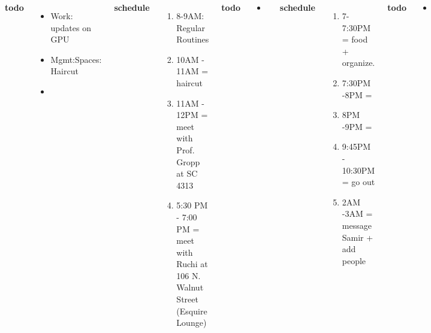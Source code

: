 \begin{frame}
{\begin{columns}
          \textbf{\small todo}\\ 
          \begin{itemize}
            \tiny \item \tiny Work: updates on GPU \dl{} \te{} \prio{}

            \tiny \item \tiny Mgmt:Spaces: Haircut  

            
          \item \tiny {} 
          \end{itemize}
          \textbf{\small schedule}\\
          \begin{enumerate}
            \tiny \item \tiny 8-9AM: Regular Routines            
          \item \tiny 10AM - 11AM  = haircut 
            \tiny \item \tiny 11AM - 12PM = meet with Prof. Gropp at
            SC 4313  
          \item \tiny 5:30 PM - 7:00 PM = meet with Ruchi at 106
            N. Walnut Street (Esquire Lounge) 
          
          \end{enumerate}
          
          \textbf{\small todo}\\
          \begin{itemize} 
            \tiny \item \tiny
          \end{itemize}
          \textbf{\small schedule}\\ 
          \begin{enumerate}
            \tiny \item \tiny 7-7:30PM = food + organize.  
            \tiny \item \tiny 7:30PM -8PM = 
            \tiny \item \tiny 8PM -9PM = 
            \tiny \item \tiny 9:45PM - 10:30PM = go out 
            \tiny \item \tiny 2AM -3AM =  message Samir + add people
          \end{enumerate}
          
          \textbf{\small todo}\\
          \begin{itemize} 
           \tiny \item \tiny 
          \end{itemize}


\end{columns}}
\end{frame}
